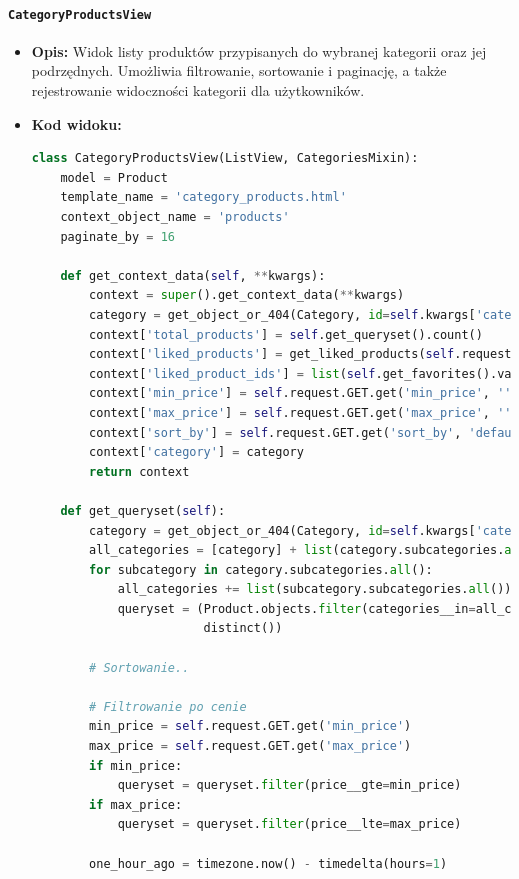 \documentclass[12pt,a4paper,oneside]{article}
\theoremstyle{definition}
\numberwithin{equation}{section}
\begin{document}
\paragraph{\texttt{CategoryProductsView}}
\begin{itemize}
    \item \textbf{Opis:} Widok listy produktów przypisanych do wybranej kategorii oraz jej podrzędnych. Umożliwia filtrowanie, sortowanie i paginację, a także rejestrowanie widoczności kategorii dla użytkowników.

    \item \textbf{Kod widoku:}
    \begin{lstlisting}[language=Python, caption=Kod widoku CategoryProductsView]
class CategoryProductsView(ListView, CategoriesMixin):
    model = Product
    template_name = 'category_products.html'
    context_object_name = 'products'
    paginate_by = 16

    def get_context_data(self, **kwargs):
        context = super().get_context_data(**kwargs)
        category = get_object_or_404(Category, id=self.kwargs['category_id'])
        context['total_products'] = self.get_queryset().count()
        context['liked_products'] = get_liked_products(self.request)
        context['liked_product_ids'] = list(self.get_favorites().values_list('id', flat=True))
        context['min_price'] = self.request.GET.get('min_price', '')
        context['max_price'] = self.request.GET.get('max_price', '')
        context['sort_by'] = self.request.GET.get('sort_by', 'default')
        context['category'] = category
        return context

    def get_queryset(self):
        category = get_object_or_404(Category, id=self.kwargs['category_id'])
        all_categories = [category] + list(category.subcategories.all())
        for subcategory in category.subcategories.all():
            all_categories += list(subcategory.subcategories.all())
            queryset = (Product.objects.filter(categories__in=all_categories).
                        distinct())

        # Sortowanie..

        # Filtrowanie po cenie
        min_price = self.request.GET.get('min_price')
        max_price = self.request.GET.get('max_price')
        if min_price:
            queryset = queryset.filter(price__gte=min_price)
        if max_price:
            queryset = queryset.filter(price__lte=max_price)

        one_hour_ago = timezone.now() - timedelta(hours=1)


\end{lstlisting}
\end{itemize}
\end{document}
